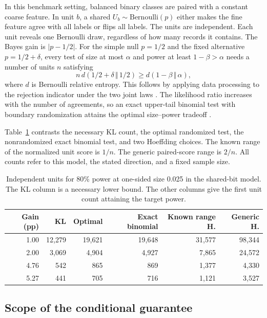 \documentclass[preprint,11pt]{elsarticle}
\begin{document}
In this benchmark setting, balanced binary classes are paired with a constant coarse feature. In unit $b$, a shared $U_b\sim\mathrm{Bernoulli}(p)$ either makes the fine feature agree with all labels or flips all labels. The units are independent. Each unit reveals one Bernoulli draw, regardless of how many records it contains. The Bayes gain is $|p-1/2|$. For the simple null $p=1/2$ and the fixed alternative $p=1/2+\delta$, every test of size at most $\alpha$ and power at least $1-\beta>\alpha$ needs a number of units $n$ satisfying
\begin{equation}
 n\,d(1/2+\delta\,\Vert\,1/2)\ge d(1-\beta\,\Vert\,\alpha),
\end{equation}
where $d$ is Bernoulli relative entropy. This follows by applying data processing to the rejection indicator under the two joint laws \cite{kaufmann2016complexity}. The likelihood ratio increases with the number of agreements, so an exact upper-tail binomial test with boundary randomization attains the optimal size--power tradeoff \cite{neyman1933tests}.

Table~\ref{tab:power} contrasts the necessary KL count, the optimal randomized test, the nonrandomized exact binomial test, and two Hoeffding choices. The known range of the normalized unit score is $1/n$. The generic paired-score range is $2/n$. All counts refer to this model, the stated direction, and a fixed sample size.

\begin{table}[t]
\centering
\small
\setlength{\tabcolsep}{4pt}
\caption{Independent units for 80\% power at one-sided size 0.025 in the shared-bit model. The KL column is a necessary lower bound. The other columns give the first unit count attaining the target power.}
\label{tab:power}
\begin{tabular}{rrrrrr}
\toprule
Gain (pp) & KL & Optimal & Exact binomial & Known range H. & Generic H. \\
\midrule
1.00 & 12,279 & 19,621 & 19,648 & 31,577 & 98,344 \\
2.00 & 3,069 & 4,904 & 4,927 & 7,865 & 24,572 \\
4.76 & 542 & 865 & 869 & 1,377 & 4,330 \\
5.27 & 441 & 705 & 716 & 1,121 & 3,527 \\
\bottomrule
\end{tabular}
\end{table}

\subsection{Scope of the conditional guarantee}
\end{document}
